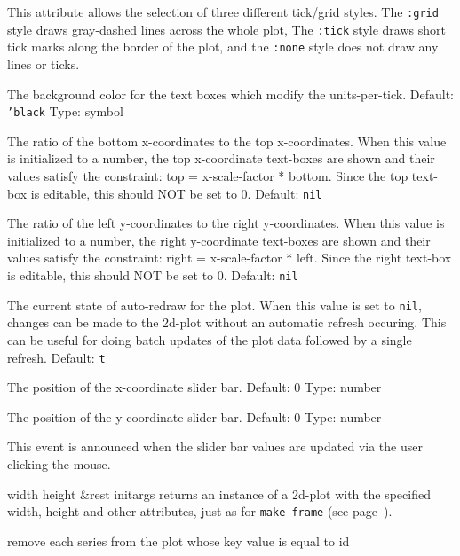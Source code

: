 \documentclass[twoside,openright,11pt]{report}
\newcommand{\tp}[1]{\texttt{#1}}
\begin{document}
This attribute allows the selection of three different tick/grid
styles.  The \tp{:grid} style draws gray-dashed lines across the
whole plot, The \tp{:tick} style draws short tick marks along the
border of the plot, and the \tp{:none} style does not draw any
lines or ticks.

{The background color for the text boxes which modify the
units-per-tick.  Default: \tp{'black} Type: symbol}

{The ratio of the bottom x-coordinates to the top x-coordinates.  When
this value is initialized to a number, the top x-coordinate text-boxes
are shown and their values satisfy the constraint: top =
x-scale-factor * bottom.  Since the top text-box is editable, this
should NOT be set to 0.  Default: \tp{nil}}

{The ratio of the left y-coordinates to the right y-coordinates.  When
this value is initialized to a number, the right y-coordinate
text-boxes are shown and their values satisfy the constraint: right =
x-scale-factor * left.  Since the right text-box is editable, this
should NOT be set to 0.  Default: \tp{nil}}

{The current state of auto-redraw for the plot.  When this value is
set to \tp{nil}, changes can be made to the 2d-plot without an
automatic refresh occuring.  This can be useful for doing batch
updates of the plot data followed by a single refresh.  Default:
\tp{t}}

{The position of the x-coordinate slider bar.  Default: 0  Type:
number}

{The position of the y-coordinate slider bar.  Default: 0  Type:
number}


{This event is announced when the slider bar values are updated via
the user clicking the mouse.}


{width height \&rest initargs}
{returns an instance of a 2d-plot with the specified width, height and
other attributes, just as for \tp{make-frame} (see
page~\pageref{pg:makeframe}).}

{remove each series from the plot whose key value is equal to id}
\end{document}

